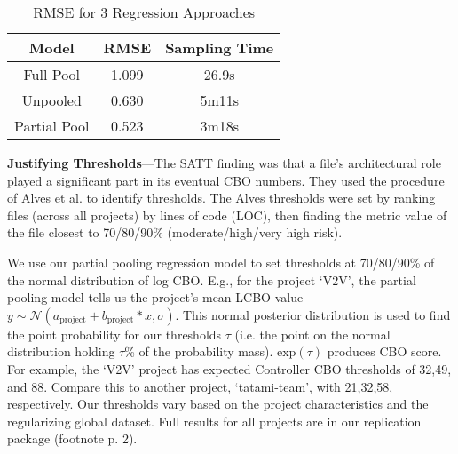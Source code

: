 \documentclass[sigconf,natbib=false]{acmart}
\begin{document}
\begin{table}
\begin{tabular}{c|c|c}
\toprule
Model 			& RMSE 	& Sampling Time \\ %
\midrule
Full Pool 		& 1.099 & 26.9s \\ %
Unpooled 		& 0.630 & 5m11s \\ %
Partial Pool 	& 0.523 & 3m18s \\ %
\bottomrule
\end{tabular}
\caption{RMSE for 3 Regression Approaches}
\label{tbl:rmse}
\end{table}

\noindent\textbf{Justifying Thresholds}---The SATT finding \cite{Aniche2016} was that a file's architectural role played a significant part in its eventual CBO numbers. They used the procedure of Alves et al. \cite{alves2010deriving} to identify thresholds. The Alves thresholds were set by ranking files (across all projects) by lines of code (LOC), then finding the metric value of the file closest to 70/80/90\% (moderate/high/very high risk). %

We use our partial pooling regression model to set thresholds at 70/80/90\% of the normal distribution of log CBO. E.g., for the project `V2V', the partial pooling model tells us the project's mean LCBO value $y \sim \mathcal{N}(a_\text{project} + b_\text{project}*x, \sigma)$. This normal posterior distribution is used to find the point probability for our thresholds $\tau$ (i.e. the point on the normal distribution holding $\tau$\% of the probability mass). $\text{exp}(\tau)$ produces CBO score. For example, the `V2V' project has expected Controller CBO thresholds of 32,49, and 88. Compare this to another project, `tatami-team', with 21,32,58, respectively. Our thresholds vary based on the project characteristics and the regularizing global dataset. Full results for all projects are in our replication package (footnote p. 2).%
\end{document}

